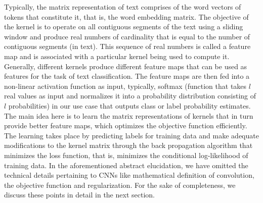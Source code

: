 Typically, the matrix representation of text comprises of the word vectors of tokens that constitute it, that is, the word embedding matrix. The objective of the kernel is to operate on all contiguous segments of the text using a sliding window and produce real numbers of cardinality that is equal to the number of contiguous segments (in text). This sequence of real numbers is called a feature map and is associated with a particular kernel being used to compute it. Generally, different kernels produce different feature maps that can be used as features for the task of text classification. The feature maps are then fed into a non-linear activation function as input, typically, softmax (function that takes $l$ real values as input and normalizes it into a probability distribution consisting of $l$ probabilities)   in our use case that outputs class or label probability estimates. The main idea here is to learn the matrix representations of kernels that in turn provide better feature maps, which optimizes the objective function efficiently. The learning takes place by predicting labels for training data and make adequate modifications to the kernel matrix through the back propagation algorithm that minimizes the loss function, that is, minimizes the conditional log-likelihood of training data. In the aforementioned abstract elucidation, we have omitted the technical details pertaining to CNNs like mathematical definition of convolution, the objective function and regularization. For the sake of completeness, we discuss these points in detail in the next section.


